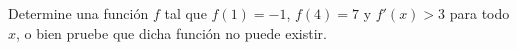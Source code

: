 \item Determine una función $f$ tal que $f(1) = -1$, $f(4) = 7$ y $f'(x) > 3$ para todo $x$, o bien pruebe que dicha función no puede existir.

